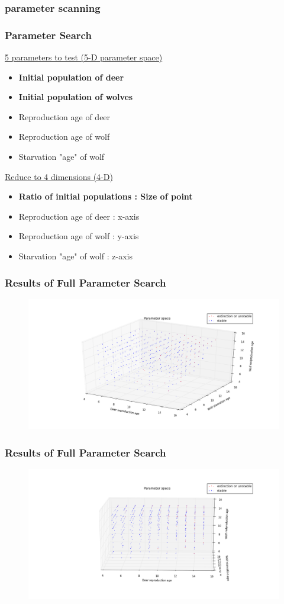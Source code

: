 \documentclass{beamer}
\begin{document}
\frame
{
  \frametitle{parameter scanning}
  
}

\frame
{
  \frametitle{Parameter Search}
  \underline{5 parameters to test (5-D parameter space)}
  \begin{itemize}
  \item{\textbf{Initial population of deer}}
  \item{\textbf{Initial population of wolves}}
  \item{Reproduction age of deer}
  \item{Reproduction age of wolf}
  \item{Starvation "age" of wolf}
  \end{itemize} 

  \underline{Reduce to 4 dimensions (4-D)}
  \begin{itemize}
  \item{\textbf{Ratio of initial populations : Size of point}}
  \item{Reproduction age of deer : x-axis}
  \item{Reproduction age of wolf : y-axis}
  \item{Starvation "age" of wolf : z-axis}
  \end{itemize} 

}
\frame
{
  \frametitle{Results of Full Parameter Search}
  \begin{figure}[H]
	\includegraphics[width = 1\textwidth]{./pics/Eco_All_param_front.png} 
  \end{figure}
        
}

\frame
{
  \frametitle{Results of Full Parameter Search}
  \begin{figure}[H]
	\includegraphics[width = 1\textwidth]{./pics/Eco_All_param_rep_v_rep.png} 
  \end{figure}
}
\end{document}
